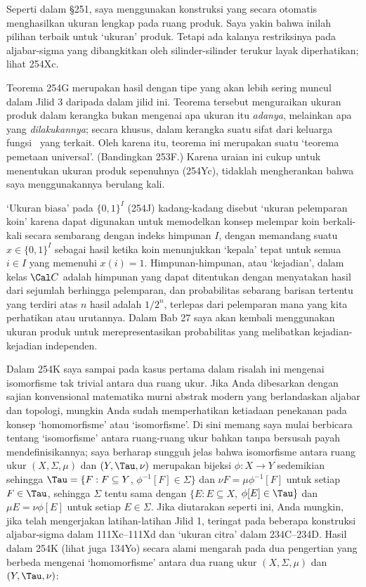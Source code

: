 {Seperti dalam \S251, saya menggunakan konstruksi yang secara otomatis menghasilkan
ukuran lengkap pada ruang produk. Saya yakin bahwa inilah pilihan terbaik
untuk `ukuran' produk. Tetapi ada kalanya
restriksinya pada aljabar-sigma yang dibangkitkan oleh silinder-silinder terukur
layak diperhatikan; lihat 254Xc.

Teorema 254G merupakan hasil dengan tipe yang akan lebih sering muncul dalam Jilid 3
daripada dalam jilid ini. Teorema tersebut menguraikan ukuran produk dalam kerangka
bukan mengenai apa ukuran itu {\it adanya}, melainkan apa yang {\it dilakukannya};
secara khusus, dalam kerangka suatu sifat dari keluarga fungsi
\imp\ yang terkait. Oleh
karena itu, teorema ini merupakan suatu `teorema pemetaan universal'. (Bandingkan 253F.)
Karena uraian ini cukup untuk menentukan ukuran produk
sepenuhnya (254Yc), tidaklah mengherankan bahwa saya menggunakannya berulang kali.

`Ukuran biasa' pada $\{0,1\}^I$ (254J) kadang-kadang disebut
`ukuran pelemparan koin' karena dapat digunakan untuk memodelkan konsep
melempar koin berkali-kali secara sembarang dengan indeks himpunan $I$, dengan memandang suatu
$x\in\{0,1\}^I$ sebagai hasil ketika koin menunjukkan `kepala'
tepat untuk semua $i\in I$ yang memenuhi $x(i)=1$. Himpunan-himpunan, atau `kejadian',
dalam kelas $\Cal C$ adalah himpunan yang dapat ditentukan dengan menyatakan
hasil dari
sejumlah berhingga pelemparan, dan probabilitas sebarang barisan tertentu yang terdiri atas
$n$ hasil adalah $1/2^n$, terlepas dari pelemparan mana yang kita perhatikan atau
urutannya. Dalam Bab 27 saya akan kembali menggunakan ukuran produk
untuk merepresentasikan probabilitas yang melibatkan kejadian-kejadian independen.

Dalam 254K saya sampai pada kasus pertama dalam risalah ini mengenai isomorfisme
tak trivial antara dua ruang ukur. Jika Anda dibesarkan dengan
sajian konvensional matematika murni abstrak modern yang berlandaskan aljabar
dan topologi, mungkin Anda sudah memperhatikan ketiadaan
penekanan pada konsep `homomorfisme' atau `isomorfisme'. Di sini
memang saya mulai berbicara tentang `isomorfisme' antara ruang-ruang ukur
bahkan tanpa bersusah payah mendefinisikannya; saya berharap sungguh jelas bahwa
isomorfisme antara ruang ukur $(X,\Sigma,\mu)$ dan
$(Y,\Tau,\nu)$ merupakan bijeksi $\phi:X\to Y$ sedemikian sehingga
$\Tau=\{F:F\subseteq Y$, $\phi^{-1}[F]\in\Sigma\}$ dan
$\nu F=\mu\phi^{-1}[F]$ untuk setiap $F\in\Tau$, sehingga $\Sigma$
tentu sama dengan $\{E:E\subseteq X$, $\phi[E]\in\Tau\}$ dan
$\mu E=\nu\phi[E]$
untuk setiap $E\in\Sigma$. Jika diutarakan seperti ini, Anda mungkin, jika telah mengerjakan
latihan-latihan Jilid 1, teringat pada beberapa konstruksi
aljabar-sigma dalam 111Xc--111Xd dan `ukuran citra' dalam
234C--234D. Hasil dalam 254K (lihat juga 134Yo) secara alami mengarah pada dua
pengertian yang berbeda mengenai
`homomorfisme' antara dua ruang ukur $(X,\Sigma,\mu)$ dan
$(Y,\Tau,\nu)$:

}
